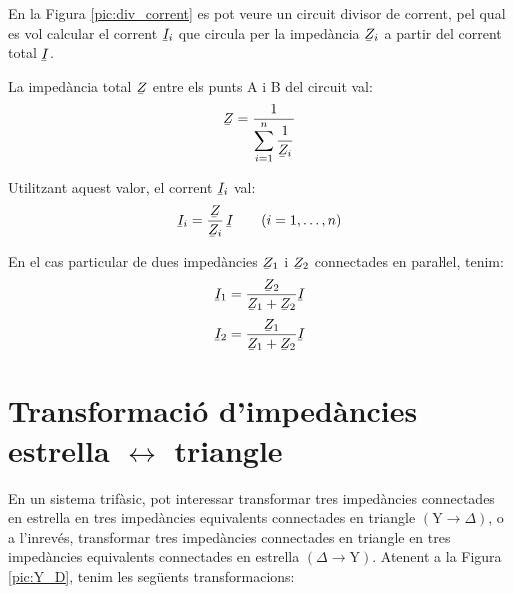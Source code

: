 En la Figura \vref{pic:div_corrent} es pot veure un circuit divisor
de corrent, pel qual es vol calcular el corrent $\cmplx{I}_i$ que
circula per la impedància $\cmplx{Z}_i$ a partir del corrent total
$\cmplx{I}$.
\begin{center}
\centering
    
    \label{pic:div_corrent}
\end{center}

La impedància total $\cmplx{Z}$ entre els punts A i B del circuit val:
\begin{equation}\label{eq:z_parallel}
    \cmplx{Z} = \frac{1}{\displaystyle\sum_{i=1}^n \frac{1}{\cmplx{Z}_i}}
\end{equation}

Utilitzant aquest valor, el corrent $\cmplx{I}_i$ val:
\begin{equation}
    \cmplx{I}_i = \frac{\cmplx{Z}}{\cmplx{Z}_i}\,\cmplx{I} \qquad (i=1,\dots,n)\label{eq:div_corrent}
\end{equation}

En el cas particular de dues impedàncies $\cmplx{Z}_1$ i $\cmplx{Z}_2$ connectades en paraŀlel, tenim:
\begin{subequations}
\begin{align}
    \cmplx{I}_1 &= \frac{\cmplx{Z}_2}{\cmplx{Z}_1+\cmplx{Z}_2} \cmplx{I}  \\[0.5ex]
    \cmplx{I}_2 &= \frac{\cmplx{Z}_1}{\cmplx{Z}_1+\cmplx{Z}_2} \cmplx{I}
\end{align}
\end{subequations}


\section{\texorpdfstring{Transformació d'impedàncies estrella $\boldsymbol{\leftrightarrow}$ triangle}
    {Transformació estrella-triangle d'impedàncies}}\label{secc:d_y} 

En un sistema trifàsic, pot interessar transformar tres impedàncies connectades en
estrella en tres impedàncies equivalents connectades en triangle
$(\text{Y}\rightarrow\Delta)$, o a l'inrevés, transformar tres impedàncies connectades en
triangle en tres impedàncies equivalents connectades en estrella
$(\Delta\rightarrow\text{Y})$. Atenent a la Figura \vref{pic:Y_D}, tenim les següents
transformacions:

